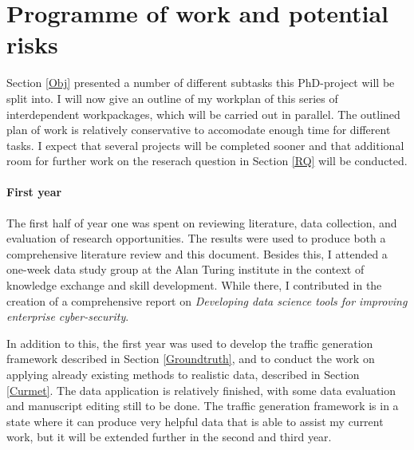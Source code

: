 \documentclass[a4paper,12pt,twoside]{report}
\begin{document}

\chapter{Programme of work and potential risks}

Section \ref{Obj} presented a number of different subtasks this PhD-project will be split into. I will now give an outline of my workplan of this series of interdependent workpackages, which will be carried out in parallel. The outlined plan of work is relatively conservative to accomodate enough time for different tasks. I expect that several projects will be completed sooner and that additional room for further work on the reserach question in Section \ref{RQ} will be conducted.

\subsubsection{First year}

The first half of year one was spent on reviewing literature, data collection, and evaluation of research opportunities. The results were used to produce both a comprehensive literature review and this document. Besides this, I attended a one-week data study group at the Alan Turing institute in the context of knowledge exchange and skill development. While there, I contributed in the creation of a comprehensive report on \textit{Developing data science tools for improving enterprise cyber-security}.

In addition to this, the first year was used to develop the traffic generation framework described in Section \ref{Groundtruth}, and to conduct the work on applying already existing methods to realistic data, described in Section \ref{Curmet}. The data application is relatively finished, with some data evaluation and manuscript editing still to be done. The traffic generation framework is in a state where it can produce very helpful data that is able to assist my current work, but it will be extended further in the second and third year.
\end{document}
